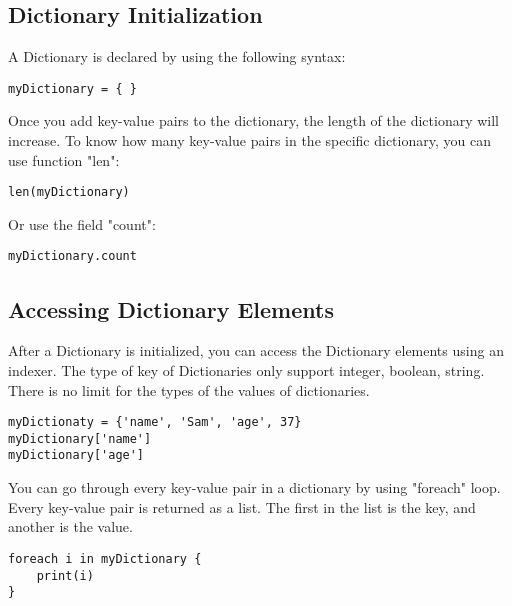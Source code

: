 \subsection{Dictionary Initialization}
A Dictionary is declared by using the following syntax:
\begin{lstlisting}
myDictionary = { }
\end{lstlisting}
Once you add key-value pairs to the dictionary, the length of the dictionary will increase. To know how many key-value pairs in the specific dictionary, you can use function "len":
\begin{lstlisting}
len(myDictionary)
\end{lstlisting}
Or use the field "count":
\begin{lstlisting}
myDictionary.count
\end{lstlisting}

\subsection{Accessing Dictionary Elements}
After a Dictionary is initialized, you can access the Dictionary elements using an indexer. The type of key of Dictionaries only support integer, boolean, string. There is no limit for the types of the values of dictionaries.
\begin{lstlisting}
myDictionaty = {'name', 'Sam', 'age', 37}
myDictionary['name']
myDictionary['age']
\end{lstlisting}
You can go through every key-value pair in a dictionary by using "foreach" loop. Every key-value pair is returned as a list. The first in the list is the key, and another is the value.
\begin{lstlisting}
foreach i in myDictionary {
	print(i)
}
\end{lstlisting}

